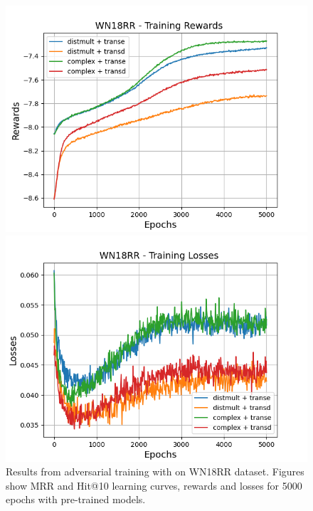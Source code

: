 \begin{figure}[H]
    \begin{minipage}{.5\textwidth}
      \centering
      \includegraphics[width=\linewidth]{figures/results/gan_train/pretrained/random/wn18rr/gan_train_random_wn18rr_rewards.png}
    \end{minipage}%
     \begin{minipage}{.5\textwidth}
      \centering
      \includegraphics[width=\linewidth]{figures/results/gan_train/pretrained/random/wn18rr/gan_train_random_wn18rr_losses.png}
    \end{minipage}%
    \caption{Results from adversarial training with \origsampling on \textsc{WN18RR} dataset.
    Figures show MRR and Hit@10 learning curves, rewards and losses for 5000 epochs with pre-trained models.}
    \label{fig:gan_train_pretrained_random_wn18rr}
\end{figure}
